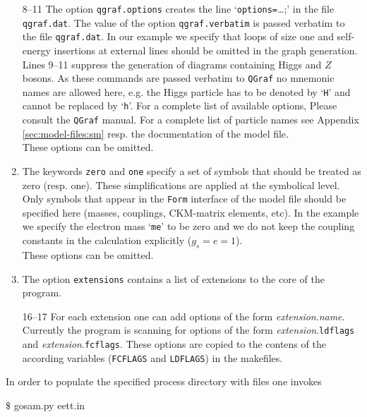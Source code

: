 \documentclass[11pt,a4paper]{refrep}
\newcommand{\qgraf}{{\tt QGraf}\xspace}
\newcommand{\form}{{\tt Form}\xspace}
\begin{document}
\begin{enumerate}
The value of this option is
translated into a \texttt{vsum} constraint in the file \texttt{qgraf.dat}.
\\This option is mandatory.
\item[8--11] The option
\texttt{qgraf.options} creates the line
`\lstinline[basicstyle=\ttfamily]{options=}\dots;' in the file
\texttt{qgraf.dat}. The value of the option \texttt{qgraf.verbatim} is
passed verbatim to the file \texttt{qgraf.dat}.
In our example we specify that loops of size one and self-energy insertions
at external lines should be omitted in the graph generation. Lines
9--11 suppress the generation of diagrams containing Higgs and $Z$ bosons.
\attention As these commands are passed verbatim to \qgraf no mnemonic names
are allowed here, e.g. the Higgs particle has to be denoted by
`\lstinline[basicstyle=\ttfamily]{H}' and cannot be replaced by
`\lstinline[basicstyle=\ttfamily]{h}'.
For a complete list of available options, Please consult the
\qgraf manual. For a complete list of particle names see 
Appendix \ref{sec:model-files:sm} resp. the
documentation of the model file.
\\These options can be omitted.
\item[12--13] The keywords \texttt{zero} and \texttt{one} specify
a set of symbols that should be treated as zero (resp. one). These
simplifications are applied at the symbolical level. Only symbols
that appear in the \form interface of the model file should be
specified here (masses, couplings, CKM-matrix elements, etc).
In the example we specify the electron mass
`\lstinline[basicstyle=\ttfamily]{me}' to be zero and we do not keep
the coupling constants in the calculation explicitly ($g_s=e=1$).
\\These options can be omitted.
\item[15] The option \texttt{extensions} contains a list of extensions
to the core of the program.
\item[16--17] For each extension one can add options of the form
\textit{extension}{.}\textit{name}. Currently the program is scanning
for options of the form \textit{extension}{.}\texttt{ldflags} and
\textit{extension}{.}\texttt{fcflags}. These options are copied
to the contens of the according variables (\texttt{FCFLAGS} and
\texttt{LDFLAGS}) in the makefiles.
\end{enumerate}

In order to populate the specified process directory with files
one invokes
\begin{example}
\$ gosam.py eett.in
\end{example}
\end{document}
